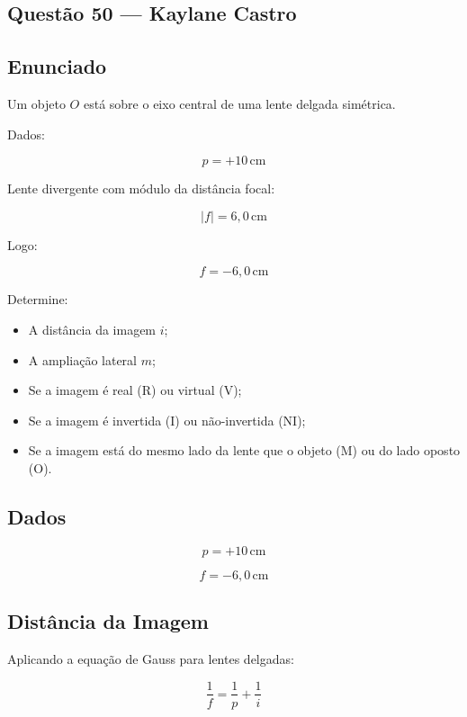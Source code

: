 \documentclass[12pt,a4paper]{article}
\begin{document}
\subsection{Questão 50 — Kaylane Castro}


\subsection*{Enunciado}

Um objeto $O$ está sobre o eixo central de uma lente delgada simétrica.

Dados:

\[
p = +10\,\text{cm}
\]

Lente divergente com módulo da distância focal:

\[
|f| = 6,0\,\text{cm}
\]

Logo:

\[
f = -6,0\,\text{cm}
\]

Determine:

\begin{itemize}
    \item[\textbf{(a)}] A distância da imagem $i$;
    \item[\textbf{(b)}] A ampliação lateral $m$;
    \item[\textbf{(c)}] Se a imagem é real (R) ou virtual (V);
    \item[\textbf{(d)}] Se a imagem é invertida (I) ou não-invertida (NI);
    \item[\textbf{(e)}] Se a imagem está do mesmo lado da lente que o objeto (M) ou do lado oposto (O).
\end{itemize}


\subsection*{Dados}

\[
p = +10\,\text{cm}
\]

\[
f = -6,0\,\text{cm}
\]


\subsection*{Distância da Imagem}

Aplicando a equação de Gauss para lentes delgadas:

\[
\frac{1}{f}
=
\frac{1}{p}
+
\frac{1}{i}
\]
\end{document}
